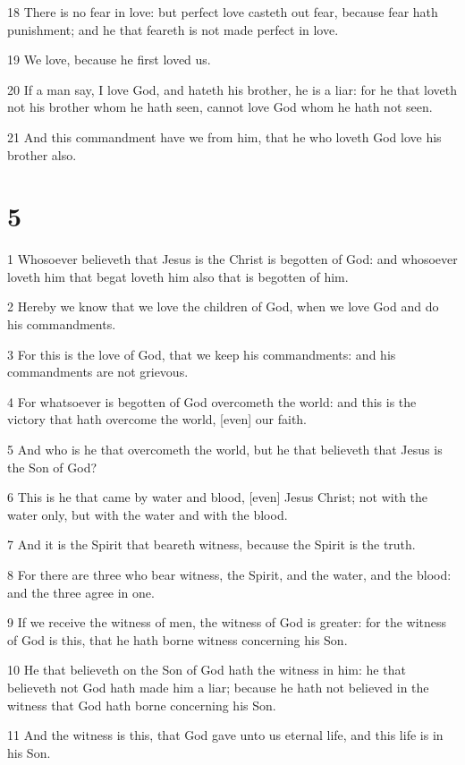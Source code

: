 \par 18 There is no fear in love: but perfect love casteth out fear, because fear hath punishment; and he that feareth is not made perfect in love.
\par 19 We love, because he first loved us.
\par 20 If a man say, I love God, and hateth his brother, he is a liar: for he that loveth not his brother whom he hath seen, cannot love God whom he hath not seen.
\par 21 And this commandment have we from him, that he who loveth God love his brother also.

\chapter{5}

\par 1 Whosoever believeth that Jesus is the Christ is begotten of God: and whosoever loveth him that begat loveth him also that is begotten of him.
\par 2 Hereby we know that we love the children of God, when we love God and do his commandments.
\par 3 For this is the love of God, that we keep his commandments: and his commandments are not grievous.
\par 4 For whatsoever is begotten of God overcometh the world: and this is the victory that hath overcome the world, [even] our faith.
\par 5 And who is he that overcometh the world, but he that believeth that Jesus is the Son of God?
\par 6 This is he that came by water and blood, [even] Jesus Christ; not with the water only, but with the water and with the blood.
\par 7 And it is the Spirit that beareth witness, because the Spirit is the truth.
\par 8 For there are three who bear witness, the Spirit, and the water, and the blood: and the three agree in one.
\par 9 If we receive the witness of men, the witness of God is greater: for the witness of God is this, that he hath borne witness concerning his Son.
\par 10 He that believeth on the Son of God hath the witness in him: he that believeth not God hath made him a liar; because he hath not believed in the witness that God hath borne concerning his Son.
\par 11 And the witness is this, that God gave unto us eternal life, and this life is in his Son.
